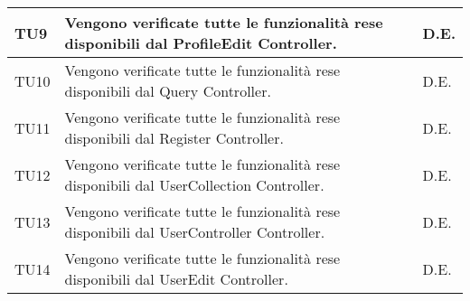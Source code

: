 \begin{center}
\begin{longtable}{|p{2cm}|p{7cm}|p{2cm}|}
\midrule
TU9
& Vengono verificate tutte le funzionalità rese disponibili dal ProfileEdit Controller.
& D.E.\\


\midrule
TU10
& Vengono verificate tutte le funzionalità rese disponibili dal Query Controller.
& D.E.\\


\midrule
TU11
& Vengono verificate tutte le funzionalità rese disponibili dal Register Controller.
& D.E.\\


\midrule
TU12
& Vengono verificate tutte le funzionalità rese disponibili dal UserCollection Controller.
& D.E.\\

\midrule
TU13
& Vengono verificate tutte le funzionalità rese disponibili dal UserController Controller.
& D.E.\\

\midrule
TU14
& Vengono verificate tutte le funzionalità rese disponibili dal UserEdit Controller.
& D.E.\\



\end{longtable}
\end{center}


